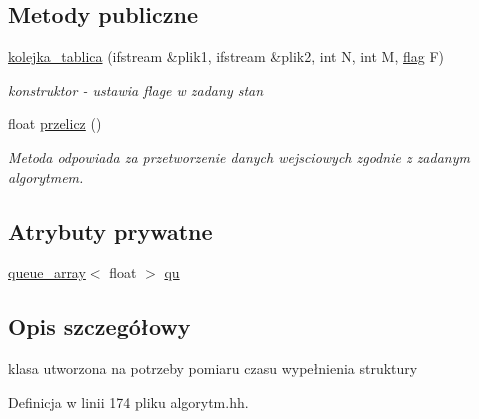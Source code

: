 \subsection*{\-Metody publiczne}
\begin{DoxyCompactItemize}
\item 
\hyperlink{classkolejka__tablica_aa99b89749fcd8c780882ebbe089cad0f}{kolejka\-\_\-tablica} (ifstream \&plik1, ifstream \&plik2, int \-N, int \-M, \hyperlink{stos_8hh_a7847560c748814fd3070e9149a9578bd}{flag} \-F)
\begin{DoxyCompactList}\small\item\em konstruktor -\/ ustawia flage w zadany stan \end{DoxyCompactList}\item 
float \hyperlink{classkolejka__tablica_aad6baa28ce61111666e70df7d6ac4f86}{przelicz} ()
\begin{DoxyCompactList}\small\item\em \-Metoda odpowiada za przetworzenie danych wejsciowych zgodnie z zadanym algorytmem. \end{DoxyCompactList}\end{DoxyCompactItemize}
\subsection*{\-Atrybuty prywatne}
\begin{DoxyCompactItemize}
\item 
\hyperlink{classqueue__array}{queue\-\_\-array}$<$ float $>$ \hyperlink{classkolejka__tablica_a7fd15c7c7a0fa3649042ec634b2b8d4f}{qu}
\end{DoxyCompactItemize}


\subsection{\-Opis szczegółowy}
klasa utworzona na potrzeby pomiaru czasu wypełnienia struktury 

\-Definicja w linii 174 pliku algorytm.\-hh.




